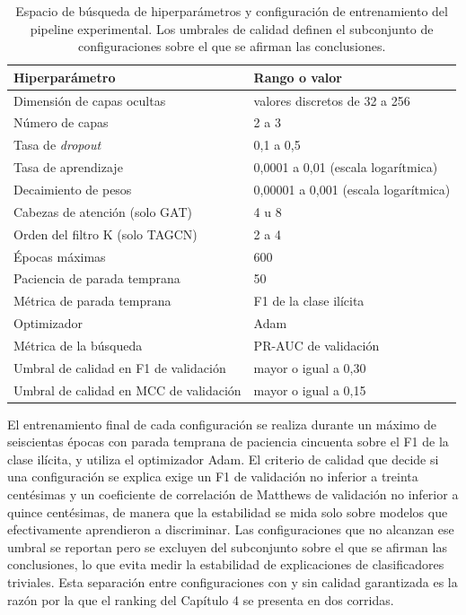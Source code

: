 \begin{table}[htbp]
\centering
\renewcommand{\arraystretch}{1.3}
\begin{tabular}{ll}
\toprule
\textbf{Hiperparámetro} & \textbf{Rango o valor} \\
\midrule
Dimensión de capas ocultas & valores discretos de 32 a 256 \\
Número de capas & 2 a 3 \\
Tasa de \textit{dropout} & 0,1 a 0,5 \\
Tasa de aprendizaje & 0,0001 a 0,01 (escala logarítmica) \\
Decaimiento de pesos & 0,00001 a 0,001 (escala logarítmica) \\
Cabezas de atención (solo GAT) & 4 u 8 \\
Orden del filtro K (solo TAGCN) & 2 a 4 \\
\midrule
Épocas máximas & 600 \\
Paciencia de parada temprana & 50 \\
Métrica de parada temprana & F1 de la clase ilícita \\
Optimizador & Adam \\
Métrica de la búsqueda & PR-AUC de validación \\
Umbral de calidad en F1 de validación & mayor o igual a 0,30 \\
Umbral de calidad en MCC de validación & mayor o igual a 0,15 \\
\bottomrule
\end{tabular}
\caption{Espacio de búsqueda de hiperparámetros y configuración de entrenamiento del pipeline experimental. Los umbrales de calidad definen el subconjunto de configuraciones sobre el que se afirman las conclusiones.}
\label{tab:hp}
\end{table}

El entrenamiento final de cada configuración se realiza durante un máximo de seiscientas épocas con parada temprana de paciencia cincuenta sobre el F1 de la clase ilícita, y utiliza el optimizador Adam. El criterio de calidad que decide si una configuración se explica exige un F1 de validación no inferior a treinta centésimas y un coeficiente de correlación de Matthews de validación no inferior a quince centésimas, de manera que la estabilidad se mida solo sobre modelos que efectivamente aprendieron a discriminar. Las configuraciones que no alcanzan ese umbral se reportan pero se excluyen del subconjunto sobre el que se afirman las conclusiones, lo que evita medir la estabilidad de explicaciones de clasificadores triviales. Esta separación entre configuraciones con y sin calidad garantizada es la razón por la que el ranking del Capítulo 4 se presenta en dos corridas.

